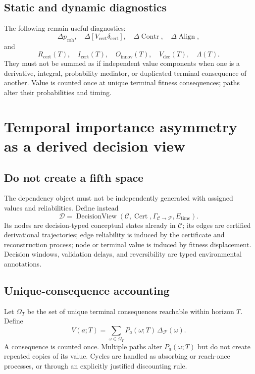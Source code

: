 \documentclass[11pt]{article}
\newcommand{\C}{\mathcal{C}}
\newcommand{\F}{\mathcal{F}}
\newcommand{\D}{\mathcal{D}}
\newcommand{\Cert}{\operatorname{Cert}}
\newcommand{\Contr}{\operatorname{Contr}}
\newcommand{\Align}{\operatorname{Align}}
\newcommand{\cert}{\mathrm{cert}}
\newcommand{\dec}{\mathrm{dec}}
\newcommand{\innov}{\mathrm{innov}}
\begin{document}
\subsection{Static and dynamic diagnostics}

The following remain useful diagnostics:
\begin{equation}
\Delta p_{\mathrm{coh}},\quad
\Delta[V_{\cert}\delta_{\cert}],\quad
\Delta\Contr,\quad
\Delta\Align,
\end{equation}
and
\begin{equation}
R_{\cert}(T),\quad I_{\cert}(T),\quad
O_{\innov}(T),\quad V_{\dec}(T),\quad
\Lambda(T).
\end{equation}
They must not be summed as if independent value components when one is a derivative, integral, probability mediator,
or duplicated terminal consequence of another. Value is counted once at unique terminal fitness consequences; paths
alter their probabilities and timing.

\section{Temporal importance asymmetry as a derived decision view}

\subsection{Do not create a fifth space}

The dependency object must not be independently generated with assigned values and reliabilities. Define instead
\begin{equation}
\D=\operatorname{DecisionView}(\C,\Cert,\Gamma_{\C\rightarrow\F},E_{\mathrm{time}}).
\end{equation}
Its nodes are decision-typed conceptual states already in $\C$; its edges are certified derivational trajectories; edge
reliability is induced by the certificate and reconstruction process; node or terminal value is induced by fitness
displacement. Decision windows, validation delays, and reversibility are typed environmental annotations.

\subsection{Unique-consequence accounting}

Let $\Omega_T$ be the set of unique terminal consequences reachable within horizon $T$. Define
\begin{equation}
V(a;T)=\sum_{\omega\in\Omega_T}P_a(\omega;T)\,\Delta_{\F}(\omega).
\end{equation}
A consequence is counted once. Multiple paths alter $P_a(\omega;T)$ but do not create repeated copies of its value.
Cycles are handled as absorbing or reach-once processes, or through an explicitly justified discounting rule.
\end{document}
